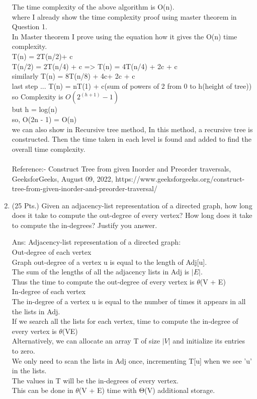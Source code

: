 \documentclass[margin=3mm]{article}
\begin{document}
\begin{enumerate}
The time complexity of the above algorithm is O(n).\\
where I already show the time complexity proof using master theorem in Question 1.\\
In Master theorem I prove using the equation how it gives the O(n) time complexity. \\
T(n) = 2T(n/2)+ c\\
T(n/2) = 2T(n/4) + c => T(n) = 4T(n/4) + 2c + c\\
similarly T(n) = 8T(n/8) + 4c+ 2c + c\\
last step ... T(n) = nT(1) + c(sum of powers of 2 from 0 to h(height of tree))\\
so Complexity is $O(2^(h+1) -1)$\\
but h = log(n)\\
so, O(2n - 1) = O(n)\\
we can also show in Recursive tree method, In this method, a recursive tree is constructed. Then the time taken in each level is found and added to find the overall time complexity.\\

\\Reference:- Construct Tree from given Inorder and Preorder traversals, GeeksforGeeks, August 09, 2022, https://www.geeksforgeeks.org/construct-tree-from-given-inorder-and-preorder-traversal/
\\

\item (25 Pts.) Given an adjacency-list representation of a directed graph, how long does it take to compute the out-degree of every vertex? How long does it take to compute the in-degrees? Justify you answer.
\item[Ans: ]Adjacency-list representation of a directed graph:\\
Out-degree of each vertex\\
Graph out-degree of a vertex u is equal to the length of Adj[u].\\
The sum of the lengths of all the adjacency lists in Adj is $|E|$.\\
Thus the time to compute the out-degree of every vertex is $\theta$(V + E)\\

In-degree of each vertex\\
The in-degree of a vertex u is equal to the number of times it appears in all the lists in Adj.\\
If we search all the lists for each vertex, time to compute the in-degree of every vertex is $\theta$(VE)\\
Alternatively, we can allocate an array T of size $|V|$ and initialize its entries to zero.\\
We only need to scan the lists in Adj once, incrementing T[u] when we see 'u' in the lists.\\
The values in T will be the in-degrees of every vertex.\\
This can be done in $\theta$(V + E) time with Θ(V) additional storage.\\


\end{enumerate}
\end{document}
